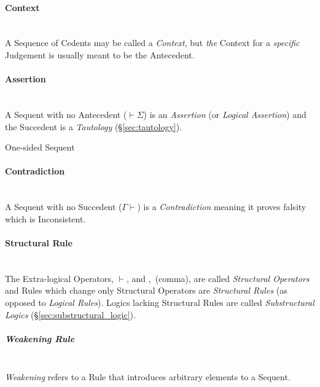 \paragraph{Context}\label{sec:sequent_context} \hfill \\

A Sequence of Cedents may be called a \emph{Context}, but \emph{the}
Context for a \emph{specific} Judgement is usually meant to be the
Antecedent.



\paragraph{Assertion}\label{sec:assertion} \hfill \\

A Sequent with no Antecedent ($\vdash \Sigma$) is an \emph{Assertion}
(or \emph{Logical Assertion}) and the Succedent is a \emph{Tautology}
(\S\ref{sec:tautology}).

One-sided Sequent



\paragraph{Contradiction}\label{sec:contradiction} \hfill \\

A Sequent with no Succedent ($\Gamma \vdash$) is a
\emph{Contradiction} meaning it proves falsity which is
Inconsistent.



\paragraph{Structural Rule}\label{sec:structural_rule} \hfill \\

The Extra-logical Operators, $\vdash$, and $,$ (comma), are called
\emph{Structural Operators} and Rules which change only Structural
Operators are \emph{Structural Rules} (as opposed to \emph{Logical
  Rules}). Logics lacking Structural Rules are called
\emph{Substructural Logics} (\S\ref{sec:substructural_logic}).



\subparagraph{Weakening Rule}\label{sec:weakening_rule} \hfill \\

\emph{Weakening} refers to a Rule that introduces arbitrary elements
to a Sequent.



